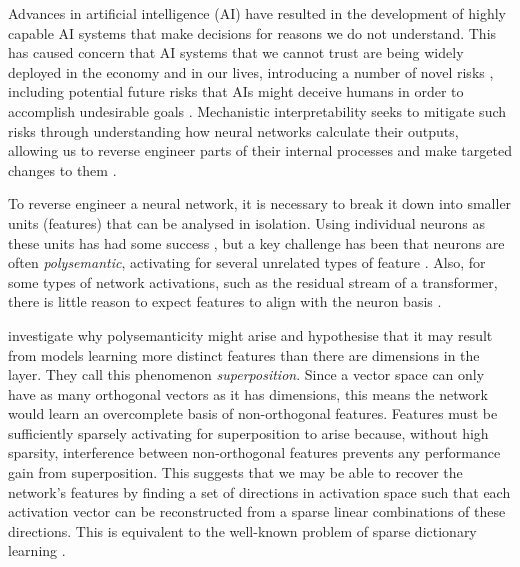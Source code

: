 Advances in artificial intelligence (AI) have resulted in the development of highly capable AI systems that make decisions for reasons we do not understand. This has caused concern that AI systems that we cannot trust are being widely deployed in the economy and in our lives, introducing a number of novel risks \citep{hendrycks2023overview}, including potential future risks that AIs might deceive humans in order to accomplish undesirable goals \citep{ngo2022alignment}. Mechanistic interpretability seeks to mitigate such risks through understanding how neural networks calculate their outputs, allowing us to reverse engineer parts of their internal processes and make targeted changes to them \citep{cammarata2021curve, wang2022interpretability, elhage2021mathematical}.

\ificlrfinal
{}
\fi

To reverse engineer a neural network, it is necessary to break it down into smaller units (features) that can be analysed in isolation. Using individual neurons as these units has had some success \citep{olah2020zoom, bills2023language}, but a key challenge has been that neurons are often \textit{polysemantic}, activating for several unrelated types of feature \citep{olah2020zoom}. Also, for some types of network activations, such as the residual stream of a transformer, there is little reason to expect features to align with the neuron basis \citep{elhage2023privileged}.

\citet{elhage2022toy} investigate why polysemanticity might arise and hypothesise that it may result from models learning more distinct features than there are dimensions in the layer. They call this phenomenon \textit{superposition}. Since a vector space can only have as many orthogonal vectors as it has dimensions, this means the network would learn an overcomplete basis of non-orthogonal features. Features must be sufficiently sparsely activating for superposition to arise because, without high sparsity, interference between non-orthogonal features prevents any performance gain from superposition. This suggests that we may be able to recover the network's features by finding a set of directions in activation space such that each activation vector can be reconstructed from a sparse linear combinations of these directions. This is equivalent to the well-known problem of sparse dictionary learning  \citep{olshausen1997sparse}. 


